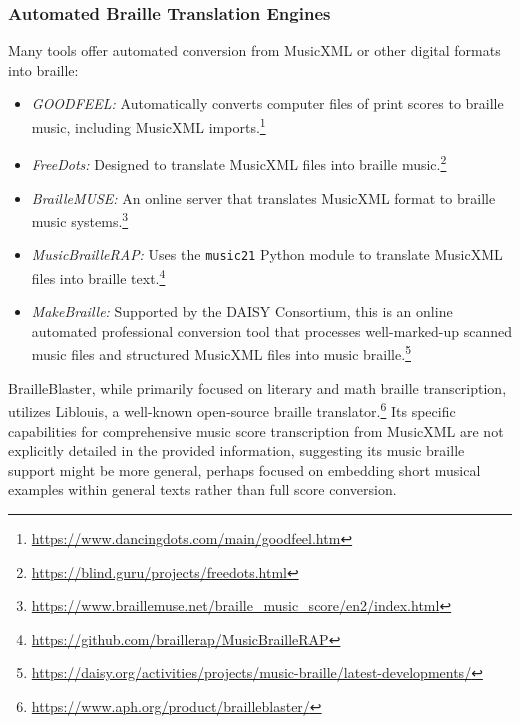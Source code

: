 \subsubsection{Automated Braille Translation Engines}
Many tools offer automated conversion from MusicXML or other digital formats into braille:
\begin{itemize}
    \item \emph{GOODFEEL:} Automatically converts computer files of print scores to braille music, including MusicXML imports.\footnote{\url{https://www.dancingdots.com/main/goodfeel.htm}}
    \item \emph{FreeDots:} Designed to translate MusicXML files into braille music.\footnote{\url{https://blind.guru/projects/freedots.html}}
    \item \emph{BrailleMUSE:} An online server that translates MusicXML format to braille music systems.\footnote{\url{https://www.braillemuse.net/braille_music_score/en2/index.html}}
    \item \emph{MusicBrailleRAP:} Uses the \texttt{music21} Python module to translate MusicXML files into braille text.\footnote{\url{https://github.com/braillerap/MusicBrailleRAP}}
    \item \emph{MakeBraille:} Supported by the DAISY Consortium, this is an online automated professional conversion tool that processes well-marked-up scanned music files and structured MusicXML files into music braille.\footnote{\url{https://daisy.org/activities/projects/music-braille/latest-developments/}}
\end{itemize}

BrailleBlaster, while primarily focused on literary and math braille transcription, utilizes Liblouis, a well-known open-source braille translator.\footnote{\url{https://www.aph.org/product/brailleblaster/}} Its specific capabilities for comprehensive music score transcription from MusicXML are not explicitly detailed in the provided information, suggesting its music braille support might be more general, perhaps focused on embedding short musical examples within general texts rather than full score conversion.

